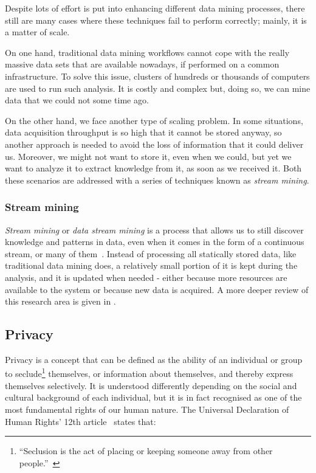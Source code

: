 Despite lots of effort is put into enhancing different data mining processes, there still 
are many cases where these techniques fail to perform correctly; mainly, it is a matter of scale.

On one hand, traditional data mining workflows cannot cope with the really massive 
data sets that are available nowadays, if performed on a common infrastructure. 
To solve this issue, clusters of hundreds or thousands of computers are used to run 
such analysis. It is costly and complex but, doing so, we can mine data that we could not 
some time ago.

On the other hand, we face another type of scaling problem. In some situations, data 
acquisition throughput is so high that it cannot be stored anyway, so another approach 
is needed to avoid the loss of information that it could deliver us. Moreover, we might 
not want to store it, even when we could, but yet we want to analyze it to extract 
knowledge from it, as soon as we received it. Both these scenarios are addressed with a 
series of techniques known as \textit{stream mining}.

\subsubsection{Stream mining}

\textit{Stream mining} or \textit{data stream mining} is a process that allows us to 
still discover knowledge and patterns in data, even when it comes in the form of a 
continuous stream, or many of them~\citep{Rajaraman:MiningMassiveDatasets}. Instead of processing 
all statically stored data, like traditional data mining does, a relatively small 
portion of it is kept during the analysis, and it is updated when needed - either because 
more resources are available to the system or because new data is acquired. A more deeper 
review of this research area is given in .

\subsection{Privacy}
\label{Introduction::Context::Privacy}

Privacy is a concept that can be defined as the ability of an individual or group to 
seclude\footnote{“Seclusion is the act of placing or keeping someone away from other people.”~\citep{web:Merriam:Seclusion}} themselves, or information about themselves, and 
thereby express themselves selectively. It is understood differently depending on the social 
and cultural background of each individual, but it is in fact recognised as one of the most 
fundamental rights of our human nature. The Universal Declaration of Human Rights’ 12th 
article~\citep{web:UN:HumanRightsDeclaration} states that:

